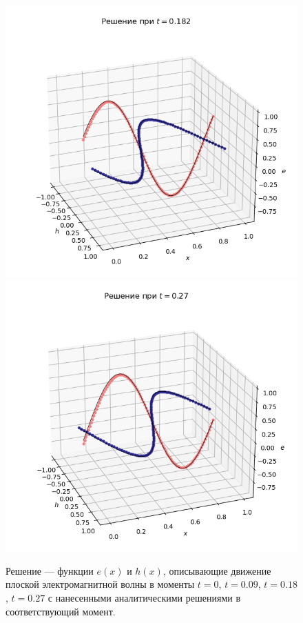\documentclass[12pt,a4paper]{article}
\begin{document}
	\begin{figure}[!h]
		\centering
		\includegraphics[width=0.45\linewidth]{figures/addd/Figure_3_t018_eh.png}
		\hspace{1em}
		\includegraphics[width=0.45\linewidth]{figures/addd/Figure_4_t027_eh.png}
		\caption{Решение --- функции $e(x)$ и $h(x)$, описывающие движение плоской электромагнитной волны в моменты $t = 0$, $t = 0.09$, $t = 0.18$, $t = 0.27$ с нанесенными аналитическими решениями в соответствующий момент.}
		\label{fig:t_00}
	\end{figure}
	
\end{document}
